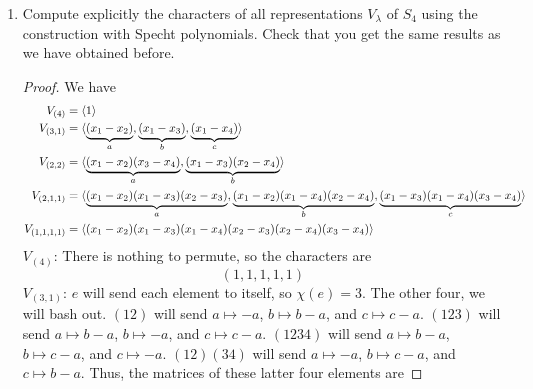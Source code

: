 \documentclass[../psets.tex]{subfiles}
\begin{document}
\begin{enumerate}
\begin{enumerate}
        \begin{proof}
            Consider a polynomial of degree $m$ with roots $x_1,\dots,x_m$. Then --- much like in the characteristic polynomial --- we have that
            \begin{equation*}
                \prod_{i=1}^m(x-x_i) = \sum_{i=0}^me_i(x_1,\dots,x_n)
            \end{equation*}
        \end{proof}
        \item Define the \textbf{complete symmetric polynomials} $h_k(x_1,\dots,x_n)$ as a sum of all \emph{distinct} monomials of degree $k$. For instance,
        \begin{equation*}
            h_3(x_1,x_2) = x_1^3+x_2^3+x_1^2x_2+x_1x_2^2+x_1x_2x_3
        \end{equation*}
        Prove that
        \begin{equation*}
            \sum_{i=0}^m(-1)^ie_i(x_1,\dots,x_n)h_{m-i}(x_1,\dots,x_n) = 0
        \end{equation*}
        Prove that $R=\Q[h_1,\dots,h_n]$.
    \end{enumerate}
    \item Compute explicitly the characters of all representations $V_\lambda$ of $S_4$ using the construction with Specht polynomials. Check that you get the same results as we have obtained before.
    \begin{proof}
        We have
        \begin{align*}
            V_{(4)} &= \langle 1 \rangle\\
            V_{(3,1)} &= \langle \underbrace{(x_1-x_2)}_a,\underbrace{(x_1-x_3)}_b,\underbrace{(x_1-x_4)}_c \rangle\\
            V_{(2,2)} &= \langle \underbrace{(x_1-x_2)(x_3-x_4)}_a,\underbrace{(x_1-x_3)(x_2-x_4)}_b \rangle\\
            V_{(2,1,1)} &= \langle \underbrace{(x_1-x_2)(x_1-x_3)(x_2-x_3)}_a,\underbrace{(x_1-x_2)(x_1-x_4)(x_2-x_4)}_b,\underbrace{(x_1-x_3)(x_1-x_4)(x_3-x_4)}_c \rangle\\
            V_{(1,1,1,1)} &= \left\langle{(x_1-x_2)(x_1-x_3)(x_1-x_4)(x_2-x_3)(x_2-x_4)(x_3-x_4)}\right\rangle
        \end{align*}
        \underline{$V_{(4)}$}: There is nothing to permute, so the characters are
        \begin{equation*}
            (1,1,1,1,1)
        \end{equation*}
        \underline{$V_{(3,1)}$}: $e$ will send each element to itself, so $\chi(e)=3$. The other four, we will bash out. $(12)$ will send $a\mapsto -a$, $b\mapsto b-a$, and $c\mapsto c-a$. $(123)$ will send $a\mapsto b-a$, $b\mapsto -a$, and $c\mapsto c-a$. $(1234)$ will send $a\mapsto b-a$, $b\mapsto c-a$, and $c\mapsto -a$. $(12)(34)$ will send $a\mapsto -a$, $b\mapsto c-a$, and $c\mapsto b-a$. Thus, the matrices of these latter four elements are

\end{proof}
\end{enumerate}
\end{document}
